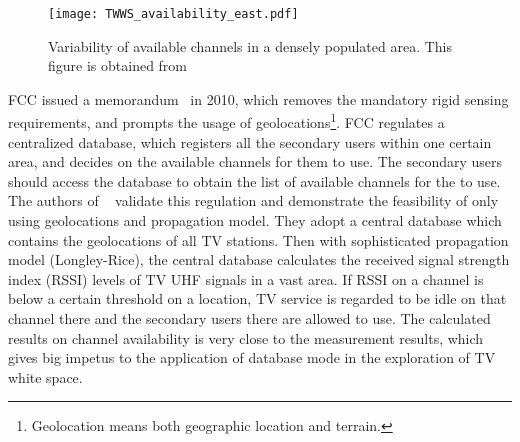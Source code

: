 \documentclass[times]{ettauth}
\theoremstyle{mytheoremstyle}
\theoremstyle{mytheoremstyle}
\theoremstyle{mytheoremstyle}
\begin{document}



\begin{figure}[h!]
  \centering
  \texttt{[image: TWWS\_availability\_east.pdf]}
  \caption{Variability of available channels in a densely populated area. This figure is obtained from \cite{googleDatabase}}
\label{variability_TVWS}
\end{figure}


FCC issued a memorandum~\cite{FCC_2010_sedond_memorandumm,FCCdatabasae} in 2010, which removes the mandatory rigid sensing requirements, and prompts the usage of geolocations\footnote{Geolocation means both geographic location and terrain.}.
FCC regulates a centralized database, which registers all the secondary users within one certain area, and decides on the available channels for them to use.
The secondary users should access the database to obtain the list of available channels for the to use.
The authors of ~\cite{SenseLess2011} validate this regulation and demonstrate the feasibility of only using geolocations and  propagation model.
They adopt a central database which contains the geolocations of all TV stations.
Then with sophisticated propagation model (Longley-Rice), the central database calculates the received signal strength index (RSSI) levels of TV UHF signals in a vast area.
If RSSI on a channel is below a certain threshold on a location, TV service is regarded to be idle on that channel there and the secondary users there are allowed to use.
The calculated results on channel availability is very close to the measurement results, which gives big impetus to the application of database mode in the exploration of TV white space.
\end{document}
